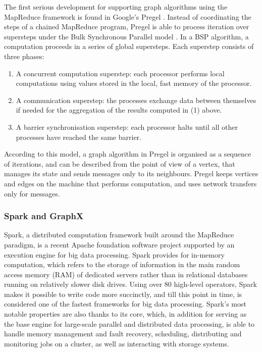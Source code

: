 The first serious development for supporting graph algorithms using the MapReduce framework is found in Google's Pregel \cite{Pregel}. Instead of coordinating the steps of a chained MapReduce program, Pregel is able to process iteration over supersteps under the Bulk Synchronous Parallel model \cite{Biss04, McColl2, Valiant}. In a BSP algorithm, a computation proceeds in a series of global supersteps. Each superstep consists of three phases:
\begin{enumerate}
\item{A concurrent computation superstep: each processor performs local computations using values stored in the local, fast memory of the processor.}
\item{A communication superstep: the processes exchange data between themselves if needed for the aggregation of the results computed in (1) above.}
\item{A barrier synchronisation superstep: each processor halts until all other processes have reached the same barrier.}
\end{enumerate}
According to this model, a graph algorithm in Pregel is organised as a sequence of iterations, and can be described from the point of view of a vertex, that manages its state and sends messages only to its neighbours. Pregel keeps vertices and edges on the machine that performs computation, and uses network transfers only for messages.

\subsubsection{Spark and GraphX}

Spark, a distributed computation framework built around the MapReduce paradigm, is a recent Apache foundation software project supported by an execution engine for big data processing. Spark provides for in-memory computation, which refers to the storage of information in the main random access memory (RAM) of dedicated servers rather than in relational databases running on relatively slower disk drives. Using over $80$ high-level operators, Spark makes it possible to write code more succinctly, and till this point in time, is considered one of the fastest frameworks for big data processing. Spark's most notable properties are also thanks to its core, which, in addition for serving as the base engine for large-scale parallel and distributed data processing, is able to handle memory management and fault recovery, scheduling, distributing and monitoring jobs on a cluster, as well as interacting with storage systems.

